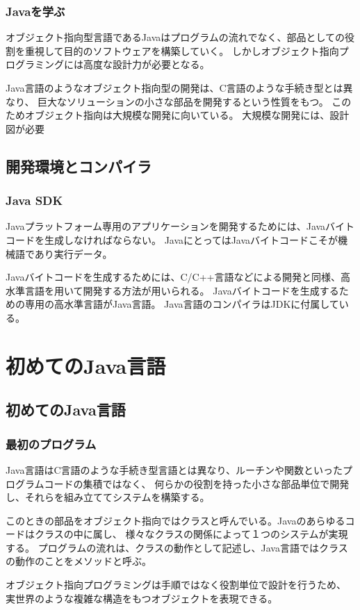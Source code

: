 \documentclass[12pt,a4j,twoside]{jsbook}
\begin{document}
\subsection{Javaを学ぶ}
オブジェクト指向型言語であるJavaはプログラムの流れでなく、部品としての役割を重視して目的のソフトウェアを構築していく。
しかしオブジェクト指向プログラミングには高度な設計力が必要となる。

Java言語のようなオブジェクト指向型の開発は、C言語のような手続き型とは異なり、
巨大なソリューションの小さな部品を開発するという性質をもつ。
このためオブジェクト指向は大規模な開発に向いている。
大規模な開発には、設計図が必要

\section{開発環境とコンパイラ}
\subsection{Java SDK}
Javaプラットフォーム専用のアプリケーションを開発するためには、Javaバイトコードを生成しなければならない。
JavaにとってはJavaバイトコードこそが機械語であり実行データ。

Javaバイトコードを生成するためには、C/C++言語などによる開発と同様、高水準言語を用いて開発する方法が用いられる。
Javaバイトコードを生成するための専用の高水準言語がJava言語。
Java言語のコンパイラはJDKに付属している。
\chapter{初めてのJava言語}
\section{初めてのJava言語}
\subsection{最初のプログラム}
Java言語はC言語のような手続き型言語とは異なり、ルーチンや関数といったプログラムコードの集積ではなく、
何らかの役割を持った小さな部品単位で開発し、それらを組み立ててシステムを構築する。

このときの部品をオブジェクト指向ではクラスと呼んでいる。Javaのあらゆるコードはクラスの中に属し、
様々なクラスの関係によって１つのシステムが実現する。
プログラムの流れは、クラスの動作として記述し、Java言語ではクラスの動作のことをメソッドと呼ぶ。

オブジェクト指向プログラミングは手順ではなく役割単位で設計を行うため、
実世界のような複雑な構造をもつオブジェクトを表現できる。
\end{document}
